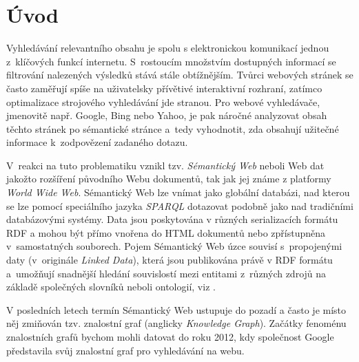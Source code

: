 \chapter*{Úvod}

Vyhledávání relevantního obsahu je spolu s elektronickou komunikací jednou z~klíčových funkcí internetu. S~rostoucím množstvím dostupných informací se filtrování nalezených výsledků stává stále obtížnějším. Tvůrci webových stránek se často zaměřují spíše na uživatelsky přívětivé interaktivní rozhraní, zatímco optimalizace strojového vyhledávání jde stranou. Pro webové vyhledávače, jmenovitě např. Google, Bing nebo Yahoo, je pak náročné analyzovat obsah těchto stránek po sémantické stránce a~tedy vyhodnotit, zda obsahují užitečné informace k~zodpovězení zadaného dotazu.

V~reakci na tuto problematiku vznikl tzv. \emph{Sémantický Web} neboli Web dat jakožto rozšíření původního Webu dokumentů, tak jak jej známe z platformy \emph{World Wide Web}. Sémantický Web lze vnímat jako globální databázi, nad kterou se lze pomocí speciálního jazyka \emph{SPARQL} dotazovat podobně jako nad tradičními databázovými systémy. Data jsou poskytována v různých serializacích formátu RDF a mohou být přímo vnořena do HTML dokumentů nebo zpřístupněna v~samostatných souborech. Pojem Sémantický Web úzce souvisí s~propojenými daty (v~originále \emph{Linked Data}), která jsou publikována právě v RDF formátu a~umožňují snadnější hledání souvislostí mezi entitami z~různých zdrojů na základě společných slovníků neboli ontologií, viz \citet{semantic-web}.

V posledních letech termín Sémantický Web ustupuje do pozadí a často je místo něj zmiňován tzv. znalostní graf (anglicky \emph{Knowledge Graph}). Začátky fenoménu znalostních grafů bychom mohli datovat do roku 2012, kdy společnost Google představila svůj znalostní graf pro vyhledávání na webu.

